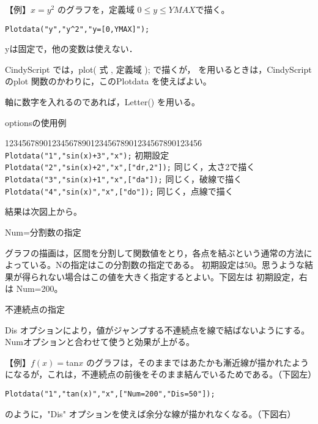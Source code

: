\documentclass[papersize,a4paper,10pt,uplatex]{jsarticle}
\begin{document}
\begin{description}
\vspace{\baselineskip}
【例】$x=y^2$ のグラフを，定義域 $0 \leq y \leq YMAX$で描く。

\hspace{10mm} \verb|Plotdata("y","y^2","y=[0,YMAX]");|

yは固定で，他の変数は使えない．

\vspace{\baselineskip}
\hspace{20mm} 


CindyScript では，plot( 式 , 定義域 ); で描くが， \ketcindy を用いるときは，CindyScript のplot 関数のかわりに，このPlotdata を使えばよい。

軸に数字を入れるのであれば，Letter() を用いる。

\vspace{\baselineskip}
optionsの使用例
\begin{tabbing}
1234\=567890123456789012345678901234567890123456\=\kill
 \> \verb|Plotdata("1","sin(x)+3","x");| \> 初期設定\\
 \> \verb|Plotdata("2","sin(x)+2","x",["dr,2"]);| \> 同じく，太さ2で描く\\
 \> \verb|Plotdata("3","sin(x)+1","x",["da"]);|\> 同じく，破線で描く\\
 \> \verb|Plotdata("4","sin(x)","x",["do"]);|\> 同じく，点線で描く
 \end{tabbing}
結果は次図上から。

\vspace{\baselineskip}
\hspace{20mm} \scalebox{0.9}{} 

Num=分割数の指定

グラフの描画は，区間を分割して関数値をとり，各点を結ぶという通常の方法によっている。Nの指定はこの分割数の指定である。 初期設定は50。思うような結果が得られない場合はこの値を大きく指定するとよい。下図左は 初期設定，右は Num=200。

\vspace{\baselineskip}
\hspace{20mm}\scalebox{0.8}{ }

不連続点の指定

Dis オプションにより，値がジャンプする不連続点を線で結ばないようにする。Numオプションと合わせて使うと効果が上がる。

\vspace{\baselineskip}
【例】$f(x)=$tan$x$ のグラフは，そのままではあたかも漸近線が描かれたようになるが，これは，不連続点の前後をそのまま結んでいるためである。（下図左）
\begin{verbatim}
Plotdata("1","tan(x)","x",["Num=200","Dis=50"]);
\end{verbatim}
のように，"Dis" オプションを使えば余分な線が描かれなくなる。（下図右）


\end{description}
\end{document}

